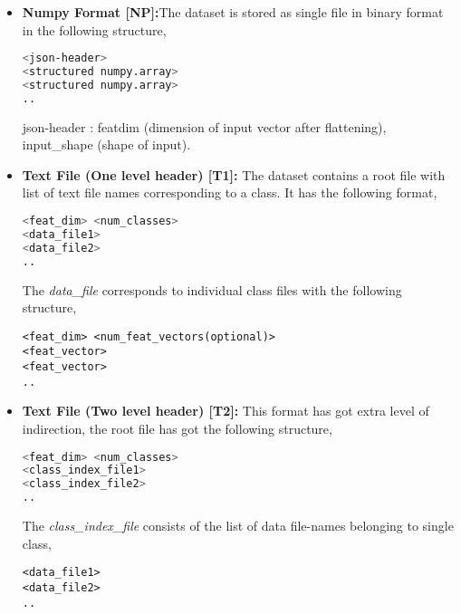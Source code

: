 \begin{itemize}
\item{\textbf {Numpy Format [NP]:}The dataset is stored as single file in binary format in the following structure,
\begin{lstlisting}[language=bash,basicstyle=\small] 
<json-header>
<structured numpy.array>
<structured numpy.array>
..
\end{lstlisting}
json-header  : featdim (dimension of input vector after flattening), input\_shape (shape of input).}

\item{\textbf {Text File (One level header) [T1]:} The dataset contains a root file with list of  text file names corresponding to a class. It has the following format,
\begin{lstlisting}[language=bash,basicstyle=\small] 
<feat_dim> <num_classes>
<data_file1>
<data_file2>
..
\end{lstlisting}
The \textit{data\_file} corresponds to individual class files with the following structure,
\begin{lstlisting}[basicstyle=\small] 
<feat_dim> <num_feat_vectors(optional)>
<feat_vector>
<feat_vector>
..
\end{lstlisting}}

\item{\textbf {Text File (Two level header) [T2]:} This format has got extra level of indirection, the root file has got the following structure,
\begin{lstlisting}[language=bash,basicstyle=\small] 
<feat_dim> <num_classes>
<class_index_file1>
<class_index_file2>
..
\end{lstlisting}
The \textit{class\_index\_file} consists of the list of data file-names belonging to single class, 
\begin{lstlisting}[basicstyle=\small] 
<data_file1>
<data_file2>
..
\end{lstlisting}}
\end{itemize}

